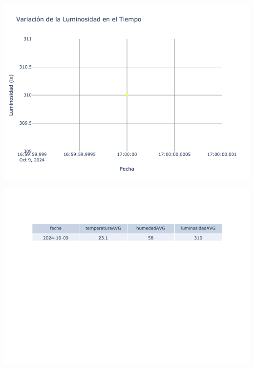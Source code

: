 \documentclass{article}
\begin{document}
    \noindent
    \begin{minipage}{0.48\textwidth}
        \centering
        \includegraphics[width=\textwidth]{../img/poli/LS401-90Dias-03-12-2024.png}
    \end{minipage}
    \hfill
    \begin{minipage}{0.48\textwidth}
        \centering
        \includegraphics[width=\textwidth]{../img/tables/CAVG401-90Dias-03-12-2024.png}
    \end{minipage}
    
\end{document}
